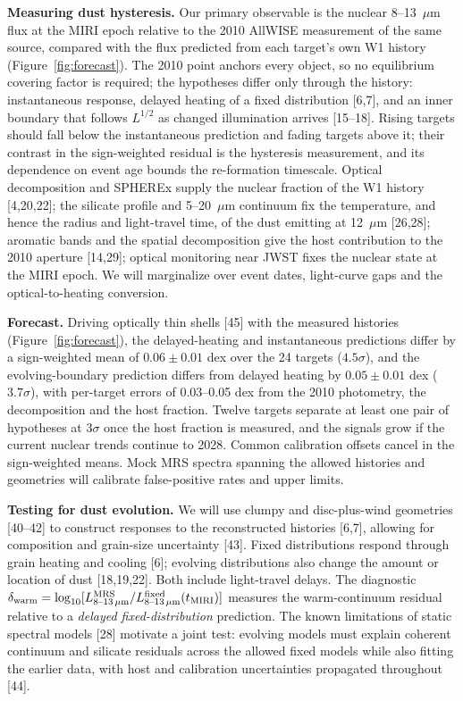 \documentclass[12pt]{article}
\begin{document}
\clearpage
\noindent\textbf{Measuring dust hysteresis.}
Our primary observable is the nuclear 8--13~$\mu$m flux at the MIRI epoch relative to the 2010 AllWISE measurement of the same source, compared with the flux predicted from each target's own W1 history (Figure~\ref{fig:forecast}). The 2010 point anchors every object, so no equilibrium covering factor is required; the hypotheses differ only through the history: instantaneous response, delayed heating of a fixed distribution [6,7], and an inner boundary that follows $L^{1/2}$ as changed illumination arrives [15--18]. Rising targets should fall below the instantaneous prediction and fading targets above it; their contrast in the sign-weighted residual is the hysteresis measurement, and its dependence on event age bounds the re-formation timescale. Optical decomposition and SPHEREx supply the nuclear fraction of the W1 history [4,20,22]; the silicate profile and 5--20~$\mu$m continuum fix the temperature, and hence the radius and light-travel time, of the dust emitting at 12~$\mu$m [26,28]; aromatic bands and the spatial decomposition give the host contribution to the 2010 aperture [14,29]; optical monitoring near JWST fixes the nuclear state at the MIRI epoch. We will marginalize over event dates, light-curve gaps and the optical-to-heating conversion.

\noindent\textbf{Forecast.} Driving optically thin shells [45] with the measured histories (Figure~\ref{fig:forecast}), the delayed-heating and instantaneous predictions differ by a sign-weighted mean of $0.06\pm0.01$ dex over the 24 targets ($4.5\sigma$), and the evolving-boundary prediction differs from delayed heating by $0.05\pm0.01$ dex ($3.7\sigma$), with per-target errors of 0.03--0.05 dex from the 2010 photometry, the decomposition and the host fraction. Twelve targets separate at least one pair of hypotheses at $3\sigma$ once the host fraction is measured, and the signals grow if the current nuclear trends continue to 2028. Common calibration offsets cancel in the sign-weighted means. Mock MRS spectra spanning the allowed histories and geometries will calibrate false-positive rates and upper limits.

\noindent\textbf{Testing for dust evolution.}
We will use clumpy and disc-plus-wind geometries [40--42] to construct responses to the reconstructed histories [6,7], allowing for composition and grain-size uncertainty [43]. Fixed distributions respond through grain heating and cooling [6]; evolving distributions also change the amount or location of dust [18,19,22]. Both include light-travel delays. The diagnostic $\delta_{\rm warm}=\log_{10}[L^{\rm MRS}_{8\text{--}13\,\mu{\rm m}}/L^{\rm fixed}_{8\text{--}13\,\mu{\rm m}}(t_{\rm MIRI})]$ measures the warm-continuum residual relative to a \emph{delayed fixed-distribution} prediction. The known limitations of static spectral models [28] motivate a joint test: evolving models must explain coherent continuum and silicate residuals across the allowed fixed models while also fitting the earlier data, with host and calibration uncertainties propagated throughout [44].
\end{document}
